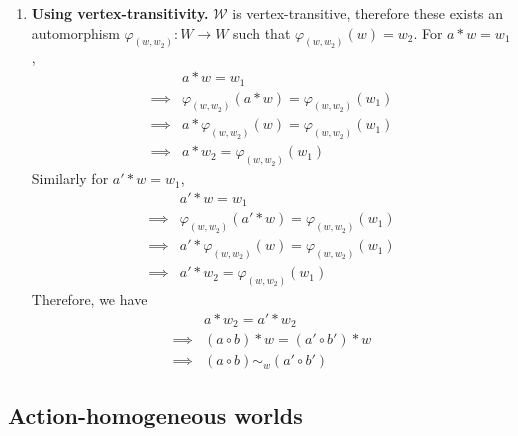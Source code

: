 \begin{proofE}
\begin{enumerate}
    \item \textbf{Using vertex-transitivity.}
    $\mathscr{W}$ is vertex-transitive, therefore these exists an automorphism $\varphi_{(w, w_{2})}: W \to W$ such that $\varphi_{(w, w_{2})}(w) = w_{2}$.
    For $a \ast w = w_{1}$,
    \begin{align}
        & a \ast w = w_{1} \\
        \implies & \varphi_{(w, w_{2})}(a \ast w) = \varphi_{(w, w_{2})}(w_{1}) \\
        \implies & a \ast \varphi_{(w, w_{2})}(w) = \varphi_{(w, w_{2})}(w_{1}) \\
        \implies & a \ast w_{2} = \varphi_{(w, w_{2})}(w_{1})
    \end{align}
    Similarly for $a' \ast w = w_{1}$,
    \begin{align}
        & a' \ast w = w_{1} \\
        \implies & \varphi_{(w, w_{2})}(a' \ast w) = \varphi_{(w, w_{2})}(w_{1}) \\
        \implies & a' \ast \varphi_{(w, w_{2})}(w) = \varphi_{(w, w_{2})}(w_{1}) \\
        \implies & a' \ast w_{2} = \varphi_{(w, w_{2})}(w_{1})
    \end{align}
    Therefore, we have
    \begin{align}
        & a \ast w_{2} = a' \ast w_{2} \\
        \implies & (a \circ b) \ast w = (a' \circ b') \ast w \\
        \implies & (a \circ b) \sim_{w} (a' \circ b')
    \end{align}
\end{enumerate}
\end{proofE}

\subsection{Action-homogeneous worlds}

